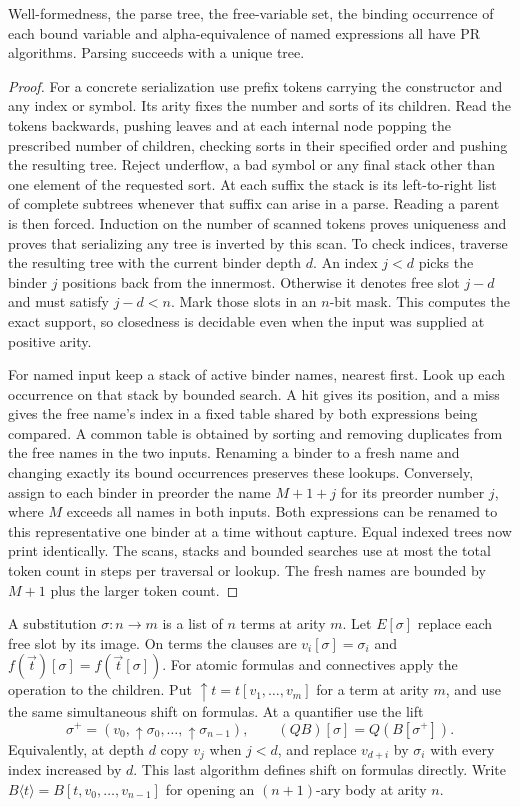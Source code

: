 \begin{theorem}\label{thm:alpha}
Well-formedness, the parse tree, the free-variable set, the binding
occurrence of each bound variable and alpha-equivalence of named
expressions all have PR algorithms. Parsing succeeds with a unique tree.
\end{theorem}
\begin{proof}
For a concrete serialization use prefix tokens carrying the constructor
and any index or symbol. Its arity fixes the number and sorts of its
children. Read the tokens backwards, pushing leaves and at each internal
node popping the prescribed number of children, checking sorts in their
specified order and pushing the resulting tree. Reject underflow,
a bad symbol or any final stack other than one element of the requested
sort. At each suffix the stack is its left-to-right list of complete
subtrees whenever that suffix can arise in a parse. Reading a parent is
then forced. Induction on the number of scanned tokens proves uniqueness
and proves that serializing any tree is inverted by this scan. To check
indices, traverse the resulting tree with the current binder depth $d$.
An index $j<d$ picks the binder $j$ positions back from the innermost.
Otherwise it denotes free slot $j-d$ and must satisfy $j-d<n$.
Mark those slots in an $n$-bit mask. This computes the exact support,
so closedness is decidable even when the input was supplied at positive
arity.

For named input keep a stack of active binder names, nearest first.
Look up each occurrence on that stack by bounded search. A hit gives its
position, and a miss gives the free name's index in a fixed table shared
by both expressions being compared. A common table is obtained by sorting
and removing duplicates from the free names in the two inputs. Renaming a
binder to a fresh name and changing exactly its bound occurrences preserves
these lookups. Conversely, assign to each binder in preorder the name
$M+1+j$ for its preorder number $j$, where $M$ exceeds all names in both
inputs. Both expressions can be renamed to this representative one binder
at a time without capture. Equal indexed trees now print identically.
The scans, stacks and bounded searches use at most the total token count
in steps per traversal or lookup. The fresh names are bounded by $M+1$
plus the larger token count.
\end{proof}

A substitution $\sigma:n\to m$ is a list of $n$ terms at arity $m$.
Let $E[\sigma]$ replace each free slot by its image. On terms the
clauses are $v_i[\sigma]=\sigma_i$ and
$f(\vec t)[\sigma]=f(\vec t[\sigma])$. For atomic formulas and
connectives apply the operation to the children. Put
$\uparrow t=t[v_1,\ldots,v_m]$ for a term at arity $m$, and use
the same simultaneous shift on formulas. At a quantifier use the lift
\[
 \sigma^+=(v_0,\uparrow\sigma_0,\ldots,\uparrow\sigma_{n-1}),
 \qquad (QB)[\sigma]=Q(B[\sigma^+]).
\]
Equivalently, at depth $d$ copy $v_j$ when $j<d$, and replace $v_{d+i}$
by $\sigma_i$ with every index increased by $d$. This last algorithm
defines shift on formulas directly. Write
$B\langle t\rangle=B[t,v_0,\ldots,v_{n-1}]$ for opening an
$(n+1)$-ary body at arity $n$.

